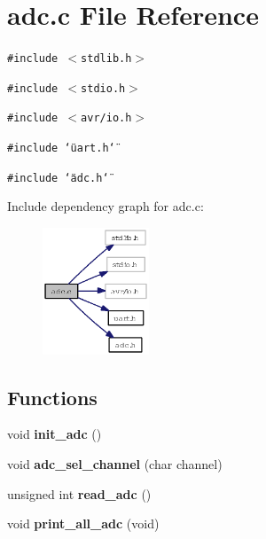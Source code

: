\section{adc.c File Reference}
\label{adc_8c}
{\tt \#include $<$stdlib.h$>$}\par
{\tt \#include $<$stdio.h$>$}\par
{\tt \#include $<$avr/io.h$>$}\par
{\tt \#include \char`\"{}uart.h\char`\"{}}\par
{\tt \#include \char`\"{}adc.h\char`\"{}}\par


Include dependency graph for adc.c:\begin{figure}[H]
\begin{center}
\leavevmode
\includegraphics[width=90pt]{adc_8c__incl}
\end{center}
\end{figure}
\subsection*{Functions}
\begin{CompactItemize}
\item 
void {\bf init\_\-adc} ()
\item 
void {\bf adc\_\-sel\_\-channel} (char channel)
\item 
unsigned int {\bf read\_\-adc} ()
\item 
void {\bf print\_\-all\_\-adc} (void)
\end{CompactItemize}
